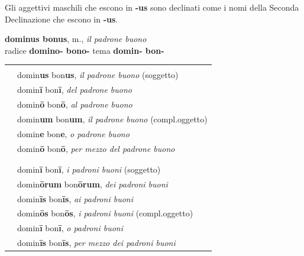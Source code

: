 \documentclass[nols]{tufte-handout}
\newcommand{\nom}{\textsc{nom}\xspace}
\newcommand{\gen}{\textsc{gen}\xspace}
\newcommand{\dat}{\textsc{dat}\xspace}
\newcommand{\acc}{\textsc{acc}\xspace}
\newcommand{\voc}{\textsc{voc}\xspace}
\newcommand{\abl}{\textsc{abl}\xspace}
\newcommand{\textls}[2][5]{%
    \begingroup\addfontfeatures{LetterSpace=#1}#2\endgroup
  }
\renewcommand{\smallcapsspacing}[1]{\textls[10]{#1}}
\renewcommand{\textsc}[1]{\smallcapsspacing{\textsmallcaps{#1}}}
\begin{document}
 Gli aggettivi maschili che escono in \textbf{-us} sono declinati come i nomi della Seconda Declinazione che escono in \textbf{-us}.

\newpage

\begin{center}
\textbf{dominus bonus}, m., \textit{il padrone buono} \\
radice \textbf{domino- bono-} \quad tema \textbf{domin- bon-}
\end{center}

\begin{fullwidth}
\begin{table}[!htbp]
  \centering
  \begin{tabular}{l l}
	& \multicolumn{1}{c}{\textsc{Singolare}}\\

    \nom & domin\textbf{us} bon\textbf{us}, \textit{il padrone buono} (soggetto) \\
    \gen & domin\textbf{ī} bon\textbf{ī}, \textit{del padrone buono} \\
    \dat & domin\textbf{ō} bon\textbf{ō}, \textit{al padrone buono}  \\
    \acc & domin\textbf{um} bon\textbf{um}, \textit{il padrone buono} (compl.oggetto) \\
    \voc & domin\textbf{e} bon\textbf{e}, \textit{o padrone buono} \\
    \abl & domin\textbf{ō} bon\textbf{ō}, \textit{per mezzo del padrone buono} \\
	
	\multicolumn{2}{c}{\textemdash} \\
	& \multicolumn{1}{c}{\textsc{Plurale}}\\

	\nom & domin\textbf{ī} bon\textbf{ī}, \textit{i padroni buoni} (soggetto)  \\
    \gen & domin\textbf{ōrum} bon\textbf{ōrum}, \textit{dei padroni buoni}   \\
    \dat & domin\textbf{īs} bon\textbf{īs}, \textit{ai padroni buoni} \\
    \acc & domin\textbf{ōs} bon\textbf{ōs}, \textit{i padroni buoni} (compl.oggetto)  \\
    \voc & domin\textbf{ī} bon\textbf{ī}, \textit{o padroni buoni}  \\
    \abl & domin\textbf{īs} bon\textbf{īs}, \textit{per mezzo dei padroni buoni} \\

  \end{tabular}
  \label{tab:normaltab}
\end{table}
\end{fullwidth}
\end{document}
